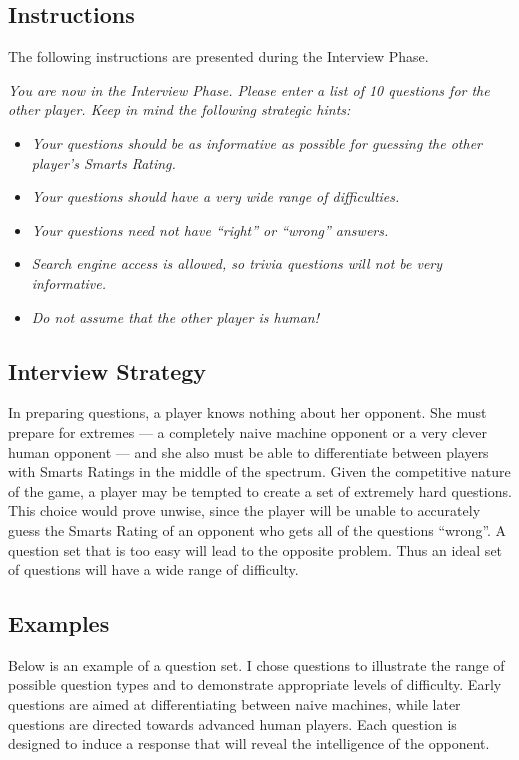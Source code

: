 \subsection{Instructions}

The following instructions are presented during the Interview Phase.
\begin{center}
\textit{You are now in the Interview Phase. Please enter a list of 10 questions for the other player. Keep in mind the following strategic hints:}

\begin{itemize}
\item \textit{Your questions should be as informative as possible for guessing the other player's Smarts Rating.}
\item \textit{Your questions should have a very wide range of difficulties.}
\item \textit{Your questions need not have ``right'' or ``wrong'' answers.}
\item \textit{Search engine access is allowed, so trivia questions will not be very informative.}
\item \textit{Do not assume that the other player is human!}
\end{itemize}
\end{center}

\subsection{Interview Strategy}

In preparing questions, a player knows nothing about her opponent. She must prepare for extremes --- a completely naive machine opponent or a very clever human opponent  --- and she also must be able to differentiate between players with Smarts Ratings in the middle of the spectrum. Given the competitive nature of the game, a player may be tempted to create a set of extremely hard questions. This choice would prove unwise, since the player will be unable to accurately guess the Smarts Rating of an opponent who gets all of the questions ``wrong''. A question set that is too easy will lead to the opposite problem. Thus an ideal set of questions will have a wide range of difficulty.

\subsection{Examples}

Below is an example of a question set. I chose questions to illustrate the range of possible question types and to demonstrate appropriate levels of difficulty. Early questions are aimed at differentiating between naive machines, while later questions are directed towards advanced human players. Each question is designed to induce a response that will reveal the intelligence of the opponent.

